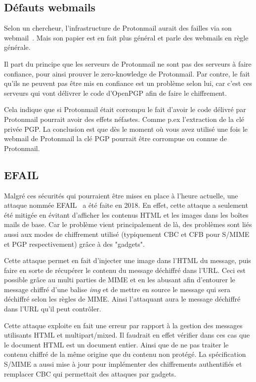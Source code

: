 \subsection{Défauts webmails}
Selon un chercheur, l'infrastructure de Protonmail aurait des failles via son webmail~\cite{journals/iacr/Kobeissi18a}. Mais son papier est en fait plus général et parle des webmails en règle générale.

Il part du principe que les serveurs de Protonmail ne sont pas des serveurs à faire confiance, pour ainsi prouver le zero-knowledge de Protonmail. Par contre, le fait qu'ils ne peuvent pas être mis en confiance est un problème selon lui, car c'est ces serveurs qui vont délivrer le code d'OpenPGP afin de faire le chiffrement.

Cela indique que si Protonmail était corrompu le fait d'avoir le code délivré par Protonmail pourrait avoir des effets néfastes. Comme p.ex l'extraction de la clé privée PGP. La conclusion est que dès le moment où vous avez utilisé une fois le webmail de Protonmail la clé PGP pourrait être corrompue ou connue de Protonmail.
\subsection{EFAIL}
\label{attacks:EFAIL}
Malgré ces sécurités qui pourraient être mises en place à l’heure actuelle, une attaque nommée EFAIL~\cite{conf/uss/PoddebniakD0ISF18} a été faite en 2018. En effet, cette attaque a seulement été mitigée en évitant d’afficher les contenus HTML et les images dans les boîtes mails de base. Car le problème vient principalement de là, des problèmes sont liés aussi aux modes de chiffrement utilisé (typiquement CBC et CFB pour S/MIME et PGP respectivement) grâce à des "gadgets".

Cette attaque permet en fait d'injecter une image dans l'HTML du message, puis faire en sorte de récupérer le contenu du message déchiffré dans l'URL. Ceci est possible grâce au multi parties de MIME et en les abusant afin d'entourer le message chiffré d'une balise \textit{img} et de mettre en source le message qui sera déchiffré selon les règles de MIME. Ainsi l'attaquant aura le message déchiffré dans l'URL qu'il peut contrôler. 

Cette attaque exploite en fait une erreur par rapport à la gestion des messages utilisants HTML et multipart/mixed. Il faudrait en effet vérifier dans ces cas que le document HTML est un document entier. Ainsi que de ne pas traiter le contenu chiffré de la même origine que du contenu non protégé. La spécification~\cite{RFC8551} S/MIME a aussi mise à jour pour implémenter des chiffrements authentifiés et remplacer CBC qui permettait des attaques par gadgets.
